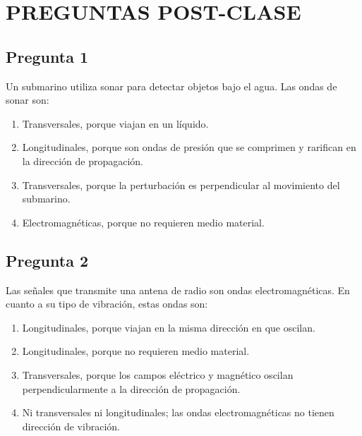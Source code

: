 \renewcommand{\tema}{Preguntas Post-Clase - Ondas}

\twocolumn
\section*{PREGUNTAS POST-CLASE}


\begin{preguntabox}
\section{Pregunta 1}
Un submarino utiliza sonar para detectar objetos bajo el agua. Las ondas de sonar son:

\begin{enumerate}
    \item[A)] Transversales, porque viajan en un líquido.
    \item[B)] Longitudinales, porque son ondas de presión que se comprimen y rarifican en la dirección de propagación.
    \item[C)] Transversales, porque la perturbación es perpendicular al movimiento del submarino.
    \item[D)] Electromagnéticas, porque no requieren medio material.
\end{enumerate}
\end{preguntabox}

\begin{preguntabox}
\section{Pregunta 2}
Las señales que transmite una antena de radio son ondas electromagnéticas. En cuanto a su tipo de vibración, estas ondas son:

\begin{enumerate}
    \item[A)] Longitudinales, porque viajan en la misma dirección en que oscilan.
    \item[B)] Longitudinales, porque no requieren medio material.
    \item[C)] Transversales, porque los campos eléctrico y magnético oscilan perpendicularmente a la dirección de propagación.
    \item[D)] Ni transversales ni longitudinales; las ondas electromagnéticas no tienen dirección de vibración.
\end{enumerate}
\end{preguntabox}

